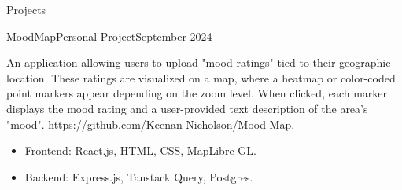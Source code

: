 \documentclass[]{Keenan-Nicholson-Resume}
\begin{document}
\begin{section}{Projects}
\begin{subsectionnobullet}{MoodMap}{Personal Project}{September 2024}{}
    \item{An application allowing users to upload "mood ratings" tied to their geographic location. These ratings are visualized on a map, where a heatmap or color-coded point markers appear depending on the zoom level. When clicked, each marker displays the mood rating and a user-provided text description of the area's "mood". \href{https://github.com/Keenan-Nicholson/Mood-Map}{https://github.com/Keenan-Nicholson/Mood-Map}.}
            \vspace{-4pt}
        \begin{itemize}[itemsep=-6.5pt]
            \item Frontend: React.js, HTML, CSS, MapLibre GL.
            \item Backend: Express.js, Tanstack Query, Postgres.
        \end{itemize}
\end{subsectionnobullet}

\end{section}

\end{document}
